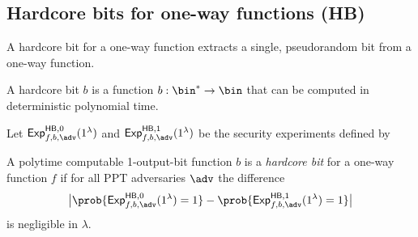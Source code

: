 \subsection{Hardcore bits for one-way functions (HB)}
A hardcore bit for a one-way function extracts a single, pseudorandom bit from a one-way function.

\begin{definition}[HB syntax]
  A hardcore bit $b$ is a function $b:\bin^*\rightarrow\bin$ that can be computed in deterministic polynomial time.
\end{definition}

\begin{definition}
  Let ${\mathsf{Exp}}_{f,b,\adv}^{\mathsf{HB},0}(1^\lambda)$ and ${\mathsf{Exp}}_{f,b,\adv}^{\mathsf{HB},1}(1^\lambda)$ be the security experiments defined by
  \begin{center}
    \begin{pchstack}
      \pchspace
    \end{pchstack}
  \end{center}
  A polytime computable 1-output-bit function $b$ is a \emph{hardcore bit} for
  a one-way function $f$ if for all PPT adversaries $\adv$ the difference
  \[ \big|\prob{{\mathsf{Exp}}_{f,b,\adv}^{\mathsf{HB},0}(1^\lambda) = 1}
    - \prob{{\mathsf{Exp}}_{f,b,\adv}^{\mathsf{HB},1}(1^\lambda) = 1}\big| \]
  is negligible in $\lambda$.
\end{definition}